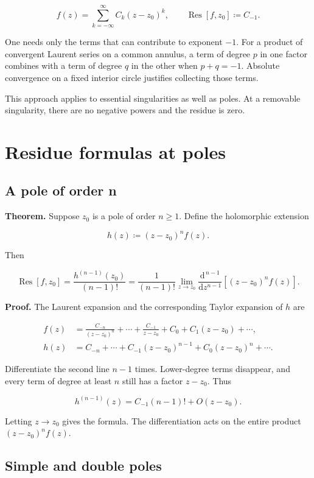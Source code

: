 \documentclass[11pt,a4paper]{article}
\theoremstyle{definition}
\theoremstyle{plain}
\begin{document}
\[
f(z)=\sum_{k=-\infty}^{\infty}C_k(z-z_0)^k,\qquad
\operatorname{Res}[f,z_0]\coloneqq C_{-1}.
\]

One needs only the terms that can contribute to exponent $-1$. For a product of convergent Laurent series on a common annulus, a term of degree $p$ in one factor combines with a term of degree $q$ in the other when $p+q=-1$. Absolute convergence on a fixed interior circle justifies collecting those terms.

This approach applies to essential singularities as well as poles. At a removable singularity, there are no negative powers and the residue is zero.

\section{Residue formulas at poles}

\subsection{A pole of order n}

\textbf{Theorem.} Suppose $z_0$ is a pole of order $n\ge1$. Define the holomorphic extension

\[
h(z)\coloneqq(z-z_0)^nf(z).
\]

Then

\[
\operatorname{Res}[f,z_0]
=\frac{h^{(n-1)}(z_0)}{(n-1)!}
=\frac1{(n-1)!}\lim_{z\to z_0}
\frac{\mathrm{d}^{\,n-1}}{\mathrm{d}z^{n-1}}
\left[(z-z_0)^nf(z)\right].
\]

\textbf{Proof.} The Laurent expansion and the corresponding Taylor expansion of $h$ are

\[
\begin{aligned}
f(z)&=\frac{C_{-n}}{(z-z_0)^n}+\cdots+\frac{C_{-1}}{z-z_0}
+C_0+C_1(z-z_0)+\cdots,\\
h(z)&=C_{-n}+\cdots+C_{-1}(z-z_0)^{n-1}
+C_0(z-z_0)^n+\cdots.
\end{aligned}
\]

Differentiate the second line $n-1$ times. Lower-degree terms disappear, and every term of degree at least $n$ still has a factor $z-z_0$. Thus

\[
h^{(n-1)}(z)=C_{-1}(n-1)!+O(z-z_0).
\]

Letting $z\to z_0$ gives the formula. The differentiation acts on the entire product $(z-z_0)^nf(z)$.

\subsection{Simple and double poles}
\end{document}
